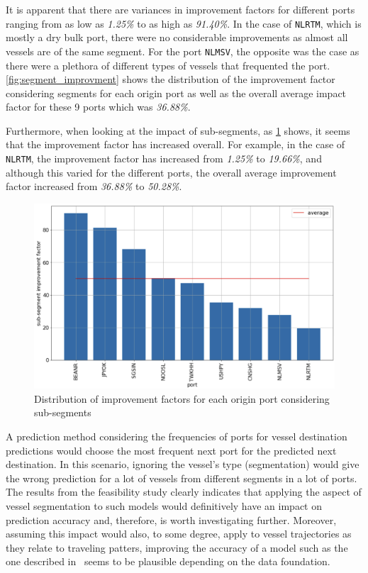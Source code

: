 It is apparent that there are variances in improvement factors for different ports ranging from as low as \textit{1.25\%} to as high as \textit{91.40\%}. In the case of \texttt{NLRTM}, which is mostly a dry bulk port, there were no considerable improvements as almost all vessels are of the same segment. For the port \texttt{NLMSV}, the opposite was the case as there were a plethora of different types of vessels that frequented the port. \cref{fig:segment_improvment} shows the distribution of the improvement factor considering segments for each origin port as well as the overall average impact factor for these 9 ports which was \textit{36.88\%}.

Furthermore, when looking at the impact of sub-segments, as \cref{fig:subsegment_improvment} shows, it seems that the improvement factor has increased overall. For example, in the case of \texttt{NLRTM}, the improvement factor has increased from \textit{1.25\%} to \textit{19.66\%}, and although this varied for the different ports, the overall average improvement factor increased from \textit{36.88\%} to \textit{50.28\%}.

\begin{figure}[htbp]
    \centering
    \includegraphics[width=.9\textwidth]{figures/apw/subsegment_improvement.png}
    \caption{Distribution of improvement factors for each origin port considering sub-segments}
    \label{fig:subsegment_improvment}
\end{figure}

A prediction method considering the frequencies of ports for vessel destination predictions would choose the most frequent next port for the predicted next destination. In this scenario, ignoring the vessel's type (segmentation) would give the wrong prediction for a lot of vessels from different segments in a lot of ports. The results from the feasibility study clearly indicates that applying the aspect of vessel segmentation to such models would definitively have an impact on prediction accuracy and, therefore, is worth investigating further. Moreover, assuming this impact would also, to some degree, apply to vessel trajectories as they relate to traveling patters, improving the accuracy of a model such as the one described in~\cite{Zhang2020AISApproach} seems to be plausible depending on the data foundation.
